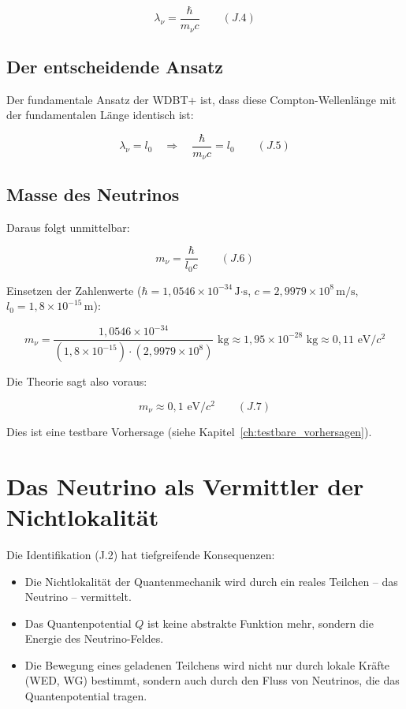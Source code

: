 \[
\lambda_{\nu} = \frac{\hbar}{m_{\nu}c} \qquad (J.4)
\]

\subsection{Der entscheidende Ansatz}
\label{sub:neutrino_oszillation_ansatz}

Der fundamentale Ansatz der WDBT+ ist, dass diese Compton-Wellenlänge mit der 
fundamentalen Länge identisch ist:

\[
\lambda_{\nu} = l_0 \quad \Rightarrow \quad \frac{\hbar}{m_{\nu}c} = l_0 \qquad (J.5)
\]

\subsection{Masse des Neutrinos}
\label{sub:neutrino_oszillation_masse_formel}

Daraus folgt unmittelbar:

\[
m_{\nu} = \frac{\hbar}{l_0 c} \qquad (J.6)
\]

Einsetzen der Zahlenwerte ($\hbar = 1,0546 \times 10^{-34}\,\text{J·s}$, 
$c = 2,9979 \times 10^8\,\text{m/s}$, $l_0 = 1,8 \times 10^{-15}\,\text{m}$):

\[
m_{\nu} = \frac{1,0546 \times 10^{-34}}{(1,8 \times 10^{-15}) \cdot (2,9979 \times 10^8)} \text{ kg}
        \approx 1,95 \times 10^{-28} \text{ kg} \approx 0,11 \text{ eV}/c^2
\]

Die Theorie sagt also voraus:

\[
m_{\nu} \approx 0,1 \text{ eV}/c^2 \qquad (J.7)
\]

Dies ist eine testbare Vorhersage (siehe Kapitel~\ref{ch:testbare_vorhersagen}).

\section{Das Neutrino als Vermittler der Nichtlokalität}
\label{app:neutrino_oszillation_nichtlokalitaet}

Die Identifikation (J.2) hat tiefgreifende Konsequenzen:
\begin{itemize}
    \item Die Nichtlokalität der Quantenmechanik wird durch ein reales Teilchen – 
          das Neutrino – vermittelt.
    \item Das Quantenpotential $Q$ ist keine abstrakte Funktion mehr, sondern die 
          Energie des Neutrino-Feldes.
    \item Die Bewegung eines geladenen Teilchens wird nicht nur durch lokale Kräfte 
          (WED, WG) bestimmt, sondern auch durch den Fluss von Neutrinos, die das 
          Quantenpotential tragen.
\end{itemize}

